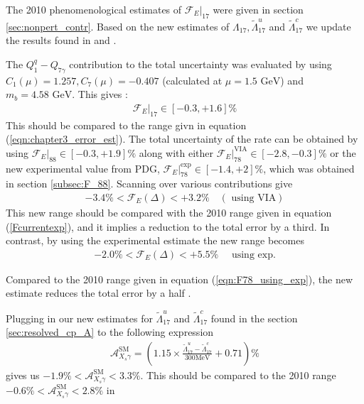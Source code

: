 The 2010 phenomenological estimates of $\mathcal{F}_E|_{17}$ were given in section \ref{sec:nonpert_contr}. Based on the new estimates of $\Lambda_{17},\tilde{\Lambda}_{17}^u$ and $\tilde{\Lambda}_{17}^c$ we update the results found in \cite{Benzke:2010js}  and \cite{Benzke:2010tq}.\par
The $Q_{1}^q-Q_{7\gamma}$ contribution to the total uncertainty was evaluated by using $C_{1}(\mu)=1.257,C_{7}(\mu)=-0.407$ (calculated at $\mu=1.5\text{ GeV}$) and $m_b=4.58\text{ GeV}$. This gives \cite{Gunawardana:2019gep, Gunawardana:2019mos}: 
\begin{eqnarray}
\left.\mathcal{F}_{E}\right|_{17} \in[-0.3,+1.6] \%
\end{eqnarray} 
This should be compared  to the range givn in equation (\ref{eqn:chapter3_error_est})\cite{Benzke:2010js}. 
The total uncertainty of the rate can be obtained by using $\left.\mathcal{F}_{E}\right|_{88} \in[-0.3,+1.9] \%$ \cite{Benzke:2010js} along with either $\left.\mathcal{F}_{E}\right|_{78} ^{\mathrm{VIA}} \in[-2.8,-0.3] \%$ or the new experimental value from PDG, $\left.\mathcal{F}_{E}\right|_{78} ^{\exp } \in[-1.4,+2] \%$, which was obtained in section \ref{subsec:F_88}. Scanning over various contributions give \cite{Gunawardana:2019gep, Gunawardana:2019mos}
\begin{eqnarray}
-3.4 \%<\mathcal{F}_{E}(\Delta)<+3.2 \% \quad(\text { using } \mathrm{VIA})
\end{eqnarray}
This new range should be compared with the 2010 range given in equation (\ref{Fcurrentexp}), and it implies a reduction to the total error by a third. In contrast, by using the experimental estimate the new range becomes  
\begin{eqnarray}
-2.0 \%<\mathcal{F}_{E}(\Delta)<+5.5 \%\quad \text{ using exp.}
\end{eqnarray}

Compared to the 2010 range given in equation (\ref{eqn:F78_using_exp}), the new estimate reduces the total error by a half \cite{Gunawardana:2019gep, Gunawardana:2019mos}.\par
Plugging in our new estimates for $\tilde{\Lambda}_{17}^u$ and $\tilde{\Lambda}_{17}^c$ found in the section \ref{sec:resolved_cp_A} to the following expression
\begin{eqnarray}
\mathcal{A}_{X_{s} \gamma}^{\mathrm{SM}}=\left(1.15 \times \frac{\tilde{\Lambda}_{17}^{u}-\tilde{\Lambda}_{17}^{c}}{300 \mathrm{MeV}}+0.71\right) \%
\end{eqnarray}
gives us $-1.9 \%<\mathcal{A}_{X_{s} \gamma}^{\mathrm{SM}}<3.3 \%$. This should be compared to the 2010 range $-0.6 \%<\mathcal{A}_{X_{s} \gamma}^{\mathrm{SM}}<2.8 \%$ in \cite{Benzke:2010tq}

